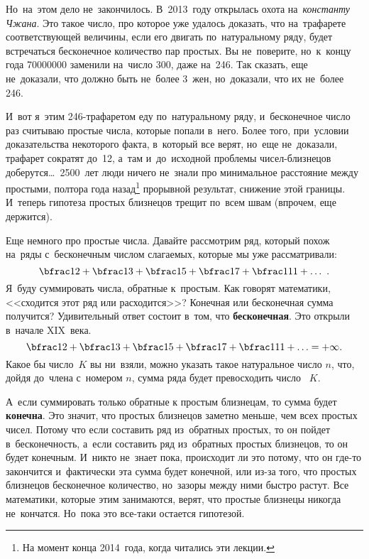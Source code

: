 Но~на~этом дело не~закончилось. В~2013~году открылась охота на~\textit{константу Чжана}. Это такое
число, про которое уже удалось доказать, что на~трафарете соответствующей величины, если его
двигать по~натуральному ряду, будет встречаться бесконечное количество пар простых. Вы не~поверите,
но~к~концу  года 70000000 заменили на~число 300, даже на~246. Так сказать, еще
не~доказали, что должно быть не~более 3~жен, но~доказали, что их не~более 246.



И~вот я~этим 246-трафаретом еду по~натуральному ряду, и~бесконечное число раз считываю простые
числа, которые попали в~него. Более того, при~условии доказательства некоторого факта, в~который
все верят, но~еще не~доказали, трафарет сократят до~12, а~там и~до~исходной проблемы
чисел-близнецов доберутся\ldots\ 2500~лет люди ничего не~знали про минимальное расстояние между
простыми, полтора года назад\footnote{На момент конца 2014~года, когда читались эти лекции.}
прорывной результат, снижение этой границы. И~теперь гипотеза простых
близнецов трещит по~всем швам (впрочем, еще держится).


Еще немного про простые числа. Давайте рассмотрим ряд, который похож на~ряды с~бесконечным числом
слагаемых, которые мы уже рассматривали:
$$
\bfrac12+\bfrac13+\bfrac15+\bfrac17+\bfrac1{11}+\ldots~.
$$
Я~буду суммировать числа, обратные к~простым. Как говорят математики, <<сходится этот ряд или
расходится>>? Конечная или бесконечная сумма получится? Удивительный ответ состоит в~том, что
\textbf{бесконечная}. Это открыли в~начале XIX~века.
$$
\bfrac12+\bfrac13+\bfrac15+\bfrac17+\bfrac1{11}+\ldots=+\infty.
$$
Какое бы число~$K$ вы ни~взяли, можно указать такое натуральное число $n$, что, дойдя до~члена
с~номером $n$, сумма ряда будет превосходить число ~$K$.

А~если суммировать только обратные к простым близнецам, то сумма будет \textbf{конечна}. Это значит, что простых
близнецов заметно меньше, чем всех простых чисел. Потому что если составить ряд из~обратных
простых, то он пойдет в~бесконечность, а~если составить ряд из~обратных простых близнецов, то он
будет конечным. И~никто не~знает пока, происходит ли это потому, что он где-то закончится
и~фактически эта сумма будет конечной, или из-за того, что простых близнецов бесконечное количество,
но~зазоры между ними быстро растут. Все математики, которые этим занимаются, верят, что простые
близнецы никогда не~кончатся. Но~пока это все-таки остается гипотезой.

